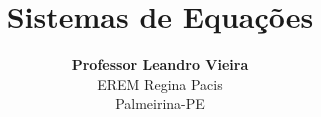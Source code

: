 \usepackage[english,brazilian]{babel}
\usepackage[utf8]{inputenc}
\usepackage[T1]{fontenc}
\usepackage[top=15mm, bottom=15mm, left=10mm, right=10mm]{geometry}

\usepackage{framed,booktabs,color,hyperref,graphicx}
\usepackage{amsfonts,amssymb,amscd,eucal,amsmath,cancel} 

\usepackage{subfigure}
\usepackage{enumerate}
\usepackage{float}
\graphicspath{{./Figuras/}}    

\usepackage{pgf,tikz}
\usetikzlibrary{arrows}

\usepackage{multicol}
\columnsep=10mm %
\setlength{\columnseprule}{0pt}

\usepackage{fancyhdr}
\lhead{\rightmark}
\renewcommand{\footrulewidth}{0.5pt}

\setlength{\parindent}{1.25cm}%

\pagestyle{fancy}
\def\MakeUppercase{} %


\usepackage{amsthm}
\newtheorem{problema}{Problema}
\newtheorem{exercicio}{exercicio}

\usepackage[skip=10pt]{caption}

\newcommand{\linha}{\center \rule{16cm}{1.25pt}}

\author{\textbf{Professor Leandro Vieira}\\EREM Regina Pacis\\Palmeirina-PE}

\title{Sistemas de Equações}

\newcommand{\m}[1]{\({#1}\)}
\newcommand{\M}[1]{\[{#1}\]}